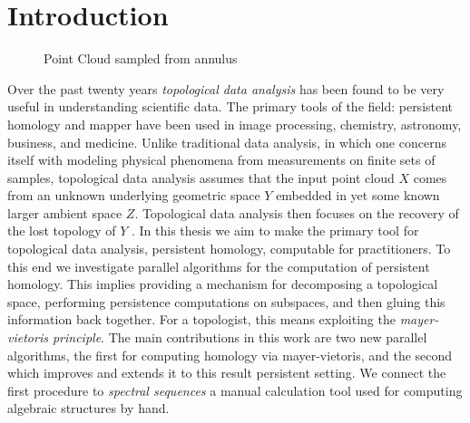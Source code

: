 \chapter{Introduction}
\begin{figure}
\centering
{}      
 \hspace{.5cm}
 \caption{Point Cloud sampled from annulus}
 \end{figure}
Over the past twenty years \emph{topological data analysis} has been found to be very useful in understanding scientific data. The primary tools of the field: persistent homology and mapper have been used in image processing, chemistry, astronomy, business, and medicine. Unlike traditional data analysis, in which one concerns itself with modeling physical phenomena from measurements on finite sets of samples, topological data analysis assumes that the input point cloud $X$ comes from an unknown underlying geometric space $Y$ embedded in yet some known larger ambient space $Z$. Topological data analysis then focuses on the recovery of the lost topology of $Y$ \cite{c-tnd-09}. In this thesis we aim to make the primary tool for topological data analysis, persistent homology, computable for practitioners. To this end we investigate parallel algorithms for the computation of persistent homology. This implies providing a mechanism for decomposing a topological space, performing persistence computations on subspaces, and then gluing this information back together. For a topologist, this means exploiting the \emph{mayer-vietoris principle}. The main contributions in this work are two new parallel algorithms, the first for computing homology via mayer-vietoris, and the second which improves and extends it to this result persistent setting. We connect the first procedure to \emph{spectral sequences} a manual calculation tool used for computing algebraic structures by hand. 

